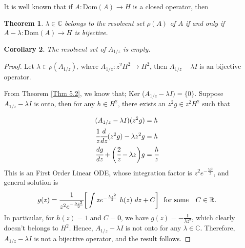 \documentclass[preprint,12pt]{elsarticle} %
\theoremstyle{plain}
\newtheorem{theorem}{Theorem}[section]
\newtheorem{corollary}[theorem]{Corollary}
\theoremstyle{definition}
\theoremstyle{remark}
\begin{document}
    It is well known that if $A:\text{Dom}(A)\rightarrow H$ is a closed operator, then
    
    \begin{theorem}\label{Thm 5.3}
      $\lambda \in \mathbb{C}$ belongs to the resolvent set $\rho (A)$ of $A$ if and only if $A-\lambda :\text{Dom}(A)\rightarrow H$ is bijective.  
    \end{theorem}
    

\begin{corollary}\label{Cor 5.4}
    The resolvent set of $A_{1/z}$ is empty. 
\end{corollary}
\begin{proof}
    Let $\lambda \in \rho(A_{1/z})$, where $A_{1/z}: z^2 H^2\rightarrow H^2$, then $A_{1/z}-\lambda I$ is an bijective operator.

    From Theorem \ref{Thm 5.2}, we know that; Ker ($A_{1/z}-\lambda I)=\{0\}$. Suppose $A_{1/z}-\lambda I$ is onto, then for any $h\in H^2$, there exists an $z^2 g\in z^2H^2$ such that

\begin{align*}
    (A_{1/z}-\lambda I)(z^2g) &= h\\
    \cfrac{1}{z}\cfrac{d}{dz}(z^2 g)-\lambda z^2 g &= h\\
    \cfrac{dg}{dz}+\bigg(\cfrac{2}{z}-\lambda z\bigg)g &= \cfrac{h}{z}
\end{align*}
    This is an First Order Linear ODE, whose integration factor is $z^2 e^{- \frac{\lambda z^2}{2}}$, and general solution is 
\begin{equation}\label{Eq 3}
    g(z)=\cfrac{1}{z^2 e^{- \frac{\lambda z^2}{2}}}\bigg[\int z e^{- \frac{\lambda z^2}{2}}~h(z)~dz+C\bigg] \text{~~for some~~ }C\in \mathbb{R}.
\end{equation}
 In particular, for $h(z)=1$ and $C=0$, we have $g(z)=-\frac{1}{\lambda z^2}$, which clearly doesn't belongs to $H^2$. Hence, $A_{1/z}-\lambda I$ is not onto for any $\lambda \in \mathbb{C}$. Therefore, $A_{1/z}-\lambda I$ is not a bijective operator, and the result follows.   
\end{proof}
\end{document}
